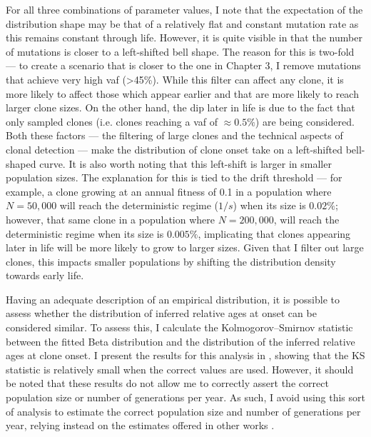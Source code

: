 \begin{figure}[!ht]
	\label{fig:beta-distance-fit}
\end{figure}

For all three combinations of parameter values, I note that the expectation of the distribution shape may be that of a relatively flat and constant mutation rate as this remains constant through life. However, it is quite visible in  that the number of mutations is closer to a left-shifted bell shape. The reason for this is two-fold --- to create a scenario that is closer to the one in Chapter 3, I remove mutations that achieve very high \ac{vaf} (>45\%). While this filter can affect any clone, it is more likely to affect those which appear earlier and that are more likely to reach larger clone sizes. On the other hand, the dip later in life is due to the fact that only sampled clones (i.e. clones reaching a \ac{vaf} of $\approx 0.5\%$) are being considered. Both these factors --- the filtering of large clones and the technical aspects of clonal detection --- make the distribution of clone onset take on a left-shifted bell-shaped curve. It is also worth noting that this left-shift is larger in smaller population sizes. The explanation for this is tied to the drift threshold --- for example, a clone growing at an annual fitness of 0.1 in a population where $N=50,000$ will reach the deterministic regime ($1/s$) when its size is $0.02\%$; however, that same clone in a population where $N=200,000$, will reach the deterministic regime when its size is $0.005\%$, implicating that clones appearing later in life will be more likely to grow to larger sizes. Given that I filter out large clones, this impacts smaller populations by shifting the distribution density towards early life. 

Having an adequate description of an empirical distribution, it is possible to assess whether the distribution of inferred relative ages at onset can be considered similar. To assess this, I calculate the Kolmogorov–Smirnov statistic between the fitted Beta distribution and the distribution of the inferred relative ages at clone onset. I present the results for this analysis in , showing that the KS statistic is relatively small when the correct values are used. However, it should be noted that these results do not allow me to correctly assert the correct population size or number of generations per year. As such, I avoid using this sort of analysis to estimate the correct population size and number of generations per year, relying instead on the estimates offered in other works \cite{Lee-Six2018-lp,Mitchell2021-zl}.

